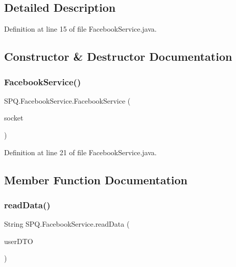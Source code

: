 \subsection{Detailed Description}


Definition at line 15 of file Facebook\+Service.\+java.



\subsection{Constructor \& Destructor Documentation}
\mbox{\label{class_s_p_q_1_1_facebook_service_a87c0122d98acc55bde0e958f59916887}} 
\subsubsection{\texorpdfstring{Facebook\+Service()}{FacebookService()}}
{\footnotesize\ttfamily S\+P\+Q.\+Facebook\+Service.\+Facebook\+Service (\begin{DoxyParamCaption}\item[{Socket}]{socket }\end{DoxyParamCaption})}



Definition at line 21 of file Facebook\+Service.\+java.



\subsection{Member Function Documentation}
\mbox{\label{class_s_p_q_1_1_facebook_service_a087e3aab2d870149c0ef74f3adf75efa}} 
\subsubsection{\texorpdfstring{read\+Data()}{readData()}}
{\footnotesize\ttfamily String S\+P\+Q.\+Facebook\+Service.\+read\+Data (\begin{DoxyParamCaption}\item[{\mbox{\hyperlink{class_s_p_q_1_1dto_1_1_user_d_t_o}{User\+D\+TO}}}]{user\+D\+TO }\end{DoxyParamCaption})}



